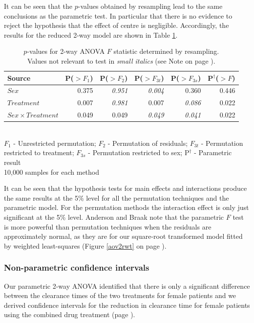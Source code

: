 It can be seen that the $p$-values obtained by resampling lead to the same conclusions as the parametric test. In particular that there is no evidence to reject the hypothesis that the effect of centre is negligible. Accordingly, the results for the reduced 2-way model are shown in Table \ref{aovresampr}.
\begin{table}[h]
\centering
\caption{$p$-values for 2-way ANOVA $F$ statistic determined by resampling.\\Values not relevant to test in \small{\textit{small italics}} (see Note on page \pageref{resampnote}).}\label{aovresampr}
\begin{tabular}{l|rrrr|r}                   
Source						&P($>F_{1}$)&P($>F_{2}$)&P($>F_{3t}$)&P($>F_{3s}$)&P$^{\dag}$($>F$)\\
\hline
$Sex$        					& 0.375 & \small{\textit{0.951}} & \small{\textit{0.004}} & 0.360 & 0.446 \\  
$Treatment$  					& 0.007 & \small{\textit{0.981}} & 0.007 			   & \small{\textit{0.086}} & 0.022 \\
$Sex\times Treatment$     		& 0.049 & 0.049 			& \small{\textit{0.049}} & \small{\textit{0.041}} & 0.022 \\
\end{tabular}\\
$F_{1}$ - Unrestricted permutation; $F_{2}$ - Permutation of residuals; $F_{3t}$ - Permutation restricted to treatment; $F_{3s}$ - Permutation restricted to sex; P$^{\dag}$ - Parametric result\\
10,000 samples for each method
\end{table}
It can be seen that the hypothesis tests for main effects and interactions produce the same results at the 5\% level for all the permutation techniques and the parametric model. For the permutation  methods the interaction effect is only just significant at the 5\% level. Anderson and Braak \cite{anderson} note that the parametric $F$ test is more powerful than permutation techniques when the residuals are approximately normal, as they are for our square-root transformed model fitted by weighted least-squares (Figure \ref{aov2rwt} on page \pageref{aov2rwt}).

\subsubsection*{Non-parametric confidence intervals}
Our parametric 2-way ANOVA identified that there is only a significant difference between the clearance times of the two treatments for female patients and we derived confidence intervals for the reduction in clearance time for female patients using the combined drug treatment (page \pageref{compinf}).


